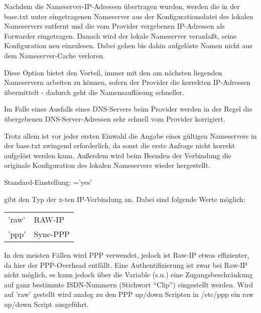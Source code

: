 \begin{description}
  Nachdem die Nameserver-IP-Adressen übertragen wurden, werden die in
  der base.txt unter \emph{} eingetragenen Nameserver
  aus der Konfigurationsdatei des lokalen Nameservers entfernt und die vom
  Provider vergebenen IP-Adressen als Forwarder eingetragen. Danach wird
  der lokale Nameserver veranlaßt, seine Konfiguration neu einzulesen.
  Dabei gehen bis dahin aufgelöste Namen nicht aus dem Nameserver-Cache
  verloren.
  
  Diese Option bietet den Vorteil, immer mit den am nächsten liegenden
  Nameservern arbeiten zu können, sofern der Provider die korrekten
  IP-Adressen übermittelt - dadurch geht die Namensauflösung
  schneller.
  
  Im Falle eines Ausfalls eines DNS-Servers beim Provider werden in
  der Regel die übergebenen DNS-Server-Adressen sehr schnell vom
  Provider korrigiert.
  
  Trotz allem ist vor jeder ersten Einwahl die Angabe eines gültigen
  Nameservers in \emph{} der base.txt zwingend
  erforderlich, da sonst die erste Anfrage nicht korrekt aufgelöst
  werden kann. Außerdem wird beim Beenden der Verbindung die originale
  Konfiguration des lokalen Nameservers wieder hergestellt.
  
  Standard-Einstellung: ='yes'


  
   gibt den Typ der x-ten IP-Verbindung an. Dabei
  sind folgende Werte möglich:

  \begin{tabular}[h!]{ll}
        'raw' &           RAW-IP\\
        'ppp' &           Sync-PPP\\
  \end{tabular}
  
  In den meisten Fällen wird PPP verwendet, jedoch ist Raw-IP etwas
  effizienter, da hier der PPP-Overhead entfällt. Eine
  Authentifizierung ist zwar bei Raw-IP nicht möglich, es kann jedoch
  über die Variable  (s.u.) eine
  Zugangsbeschränkung auf ganz bestimmte ISDN-Nummern (Stichwort
  ``Clip'') eingestellt werden.  Wird 
  auf 'raw' gestellt wird analog zu den PPP up/down Scripten in
  /etc/ppp ein raw up/down Script ausgeführt.

  

\end{description}
